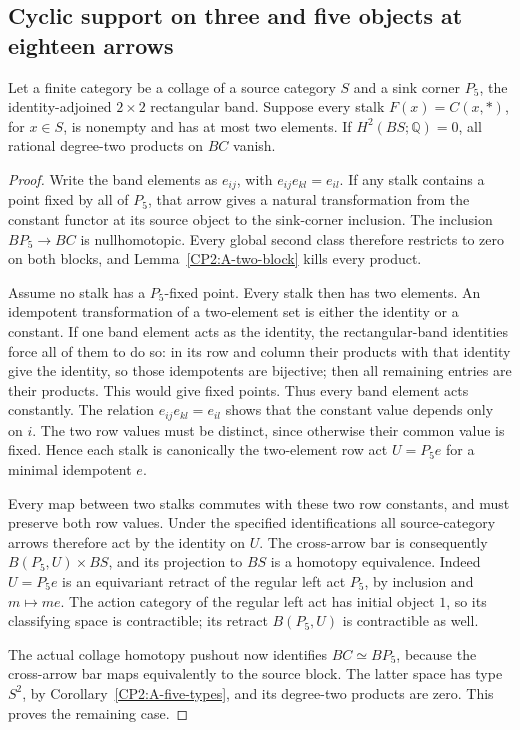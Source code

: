 \subsection{Cyclic support on three and five objects at eighteen arrows}

\begin{lemma}
\label{CP2:A-P5-binary-source-block}
Let a finite category be a collage of a source category $S$ and
a sink corner $P_5$, the identity-adjoined $2\times2$ rectangular
band. Suppose every stalk $F(x)=C(x,*)$, for $x\in S$, is nonempty
and has at most two elements. If $H^2(BS;\mathbb Q)=0$, all rational
degree-two products on $BC$ vanish.
\end{lemma}
\begin{proof}
Write the band elements as $e_{ij}$, with
$e_{ij}e_{kl}=e_{il}$. If any stalk contains a point fixed by all
of $P_5$, that arrow gives a natural transformation from the
constant functor at its source object to the sink-corner inclusion.
The inclusion $BP_5\to BC$ is nullhomotopic. Every global second
class therefore restricts to zero on both blocks, and
Lemma~\ref{CP2:A-two-block} kills every product.

Assume no stalk has a $P_5$-fixed point. Every stalk then has two
elements. An idempotent transformation of a two-element set is
either the identity or a constant. If one band element acts as
the identity, the rectangular-band identities force all of them
to do so: in its row and column their products with that identity
give the identity, so those idempotents are bijective; then all
remaining entries are their products. This would give fixed
points. Thus every band element acts constantly. The relation
$e_{ij}e_{kl}=e_{il}$ shows that the constant value depends only
on $i$. The two row values must be distinct, since otherwise their
common value is fixed. Hence each stalk is canonically the
two-element row act $U=P_5e$ for a minimal idempotent $e$.

Every map between two stalks commutes with these two row constants,
and must preserve both row values. Under the specified
identifications all source-category arrows therefore act by the
identity on $U$. The cross-arrow bar is consequently
$B(P_5,U)\times BS$, and its projection to $BS$ is a homotopy
equivalence. Indeed $U=P_5e$ is an equivariant retract of the
regular left act $P_5$, by inclusion and $m\mapsto me$.
The action category of the regular left act has initial object
$1$, so its classifying space is contractible; its retract
$B(P_5,U)$ is contractible as well.

The actual collage homotopy pushout now identifies $BC\simeq BP_5$,
because the cross-arrow bar maps equivalently to the source block.
The latter space has type $S^2$, by
Corollary~\ref{CP2:A-five-types}, and its degree-two products are
zero. This proves the remaining case.
\end{proof}

